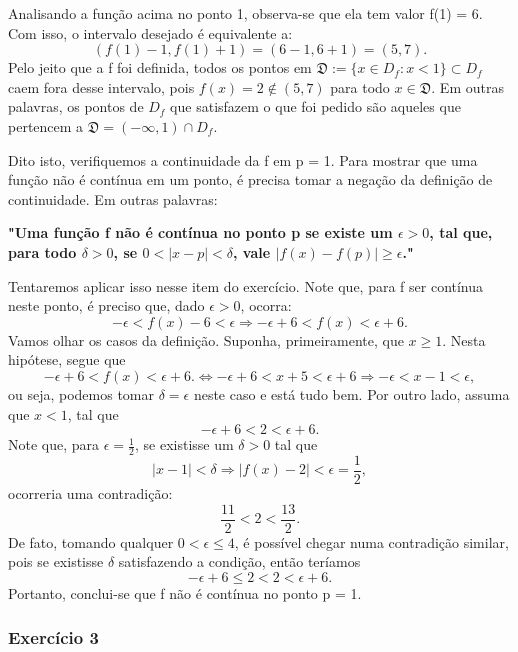 \begin{sol*}
Analisando a fun\c c\~ao acima no ponto 1, observa-se que ela tem valor f(1) = 6. Com isso, o intervalo desejado \'e equivalente a:
$$
(f(1) - 1, f(1) + 1) = (6 - 1, 6 + 1) = (5, 7).
$$
Pelo jeito que a f foi definida, todos os pontos em $\mathfrak{D}:=\{x\in{D_{f}}: x < 1\} \subset{D_{f}}$ caem fora desse intervalo, pois $f(x) = 2\notin{(5, 7)}$ para todo $x\in\mathfrak{D}.$ Em outras palavras, os pontos de $D_f$ que satisfazem o que foi pedido s\~ao aqueles que pertencem a $\mathfrak{D} = (-\infty, 1)\cap{D_{f}}$. 

Dito isto, verifiquemos a continuidade da f em p = 1. Para mostrar que uma fun\c c\~ao n\~ao \'e cont\'inua em um ponto, \'e precisa tomar a nega\c c\~ao da defini\c c\~ao de continuidade. Em outras palavras:

\textbf{ "Uma fun\c c\~ao f n\~ao \'e cont\'inua no ponto p se existe um $\epsilon > 0$, tal que, para todo $\delta > 0$, se $0 < |x - p| < \delta$, vale $|f(x) - f(p)|\geq\epsilon$."}

Tentaremos aplicar isso nesse item do exerc\'icio. Note que, para f ser cont\'inua neste ponto, \'e preciso que, dado $\epsilon > 0$, ocorra:
$$
-\epsilon < f(x) - 6 < \epsilon \Rightarrow -\epsilon + 6 < f(x) < \epsilon + 6.
$$
Vamos olhar os casos da defini\c c\~ao. Suponha, primeiramente, que $x\geq 1$. Nesta hip\'otese, segue que 
$$
-\epsilon + 6 < f(x) < \epsilon + 6. \Leftrightarrow -\epsilon + 6 < x + 5 < \epsilon + 6 \Rightarrow -\epsilon < x - 1 < \epsilon,
$$
ou seja, podemos tomar $\delta = \epsilon$ neste caso e est\'a tudo bem. Por outro lado, assuma que $x < 1$, tal que
$$
-\epsilon + 6 < 2 < \epsilon + 6.
$$
Note que, para $\epsilon = \frac{1}{2}$, se existisse um $\delta > 0$ tal que
$$
|x - 1| < \delta \Rightarrow |f(x) - 2| < \epsilon = \frac{1}{2},
$$
ocorreria uma contradi\c c\~ao:
$$
\frac{11}{2} < 2 < \frac{13}{2}.
$$
De fato, tomando qualquer $0 < \epsilon \leq 4$, \'e poss\'ivel chegar numa contradi\c c\~ao similar, pois se existisse $\delta$ satisfazendo a condi\c c\~ao, ent\~ao ter\'iamos
$$
-\epsilon + 6 \leq 2 < 2 < \epsilon + 6.
$$
Portanto, conclui-se que f n\~ao \'e cont\'inua no ponto p = 1.
\qedsymbol
\end{sol*}

\subsubsection{Exerc\'icio 3} 
